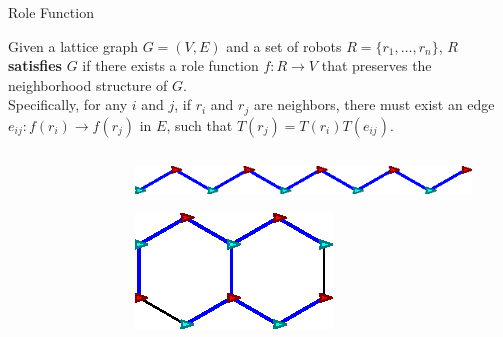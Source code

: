 \documentclass[10pt]{beamer}
\newcommand{\edge}[3]{{#1}\overset{#2}{\longrightarrow}{#3}}
\begin{document}
\begin{frame}{Role Function}
  \begin{definition}
    \small{Given a lattice graph $G=(V, E)$ and a set of robots $R = \{
    r_1, \ldots, r_n \}$, $R$ \textbf{satisfies} $G$ if
    there exists a role function $f: R \rightarrow V$ that preserves
    the neighborhood structure of $G$.
    \\
    Specifically, for any $i$ and $j$, if $r_i$ and $r_j$ are neighbors, 
    there must exist an edge
    $e_{ij}: \edge{f(r_i)}{}{f(r_j)}$ in $E$, such that
    $ T(r_j) = T(r_i) T(e_{ij})$.}
  \end{definition}
  \begin{columns}[T] 
    \begin{column}{.4\textwidth}
      \begin{figure}
        \centering
      \end{figure}
    \end{column}%
    \begin{column}{.5\textwidth}
      \begin{figure}
        \centering
        \includegraphics[width=0.75\linewidth]{figs/bad-hexagon}
      \end{figure}
      \begin{figure}
        \centering
        \includegraphics[scale=0.8]{figs/good-hexagon}
        \end{figure}
    \end{column}%
  \end{columns}
\end{frame}
\end{document}
